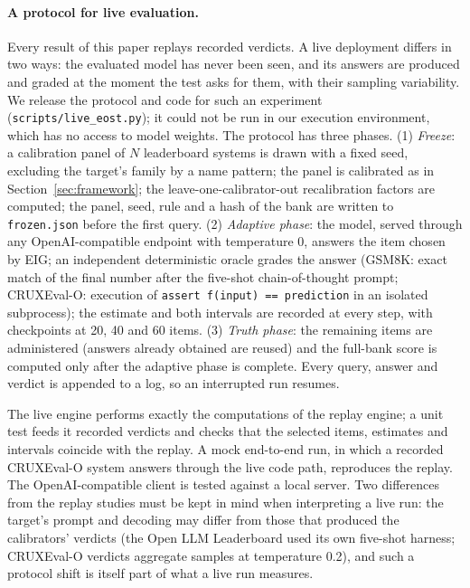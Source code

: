 \paragraph{A protocol for live evaluation.}\label{sec:live} Every result of this paper replays recorded verdicts. A live deployment differs in two
ways: the evaluated model has never been seen, and its answers are produced and graded at
the moment the test asks for them, with their sampling variability. We release the
protocol and code for such an experiment (\texttt{scripts/live\_eost.py}); it could not be
run in our execution environment, which has no access to model weights. The protocol has three
phases. (1) \emph{Freeze}: a calibration panel of $N$ leaderboard systems is
drawn with a fixed seed, excluding the target's family by a name pattern; the panel is
calibrated as in Section~\ref{sec:framework}; the leave-one-calibrator-out recalibration
factors are computed; the panel, seed, rule and a hash of the bank are written to
\texttt{frozen.json} before the first query. (2) \emph{Adaptive phase}: the model, served
through any OpenAI-compatible endpoint with temperature 0, answers the item chosen by EIG;
an independent deterministic oracle grades the answer (GSM8K: exact match of the final
number after the five-shot chain-of-thought prompt; CRUXEval-O: execution of
\texttt{assert f(input) == prediction} in an isolated subprocess); the estimate and both
intervals are recorded at every step, with checkpoints at 20, 40 and 60 items. (3)
\emph{Truth phase}: the remaining items are administered (answers already obtained are
reused) and the full-bank score is computed only after the adaptive phase is complete.
Every query, answer and verdict is appended to a log, so an interrupted run resumes.

The live engine performs exactly the computations of the replay
engine; a unit test feeds it recorded verdicts and checks that the selected items,
estimates and intervals coincide with the replay. A mock end-to-end run, in which a
recorded CRUXEval-O system answers through the live code path, reproduces the replay.
The OpenAI-compatible client is tested against a local server. Two differences from the
replay studies must be kept in mind when interpreting a live run: the target's prompt and
decoding may differ from those that produced the calibrators' verdicts (the Open LLM
Leaderboard used its own five-shot harness; CRUXEval-O verdicts aggregate samples at
temperature 0.2), and such a protocol shift is itself part of what a live run measures.

